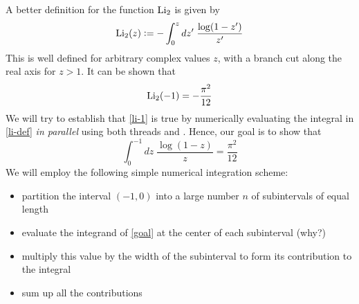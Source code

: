 %
%
%
%

\pagestyle{headandfoot}
\runningfootrule
{}
\runningheader{}{}{}
\firstpagefooter{}{}{}



\def\Li{\mbox{\rm Li}_{2}}
\def\len{\mbox{\rm length}}
\def\dilog{\mbox{\tt dilog}}

A better definition for the function $\Li$ is given by
\begin{equation}
\Li(z) \bydef
- \int_{0}^{z} dz' \; \frac{\log(1-z')}{z'} \label{eq:li-def}
\end{equation}
This is well defined for arbitrary complex values $z$, with a branch cut along the real axis
for $z > 1$. It can be shown that
\begin{equation}
  \Li(-1)  = - \frac{\pi^{2}}{12} \label{eq:li-1}
\end{equation}
We will try to establish that \eqref{li-1} is true by numerically evaluating the integral in
\eqref{li-def} {\em in parallel} using both threads and \mpi. Hence, our goal is to show that
\begin{equation}
  \int_{0}^{-1} dz \; \frac{\log(1-z)}{z} = \frac{\pi^{2}}{12} \label{eq:goal} 
\end{equation}
We will employ the following simple numerical integration scheme:
\begin{itemize}
 \item partition the interval $(-1,0)$ into a large number $n$ of subintervals of equal length
 \item evaluate the integrand of \eqref{goal} at the center of each subinterval (why?)
 \item multiply this value by the width of the subinterval to form its contribution to the
   integral
 \item sum up all the contributions
\end{itemize}

